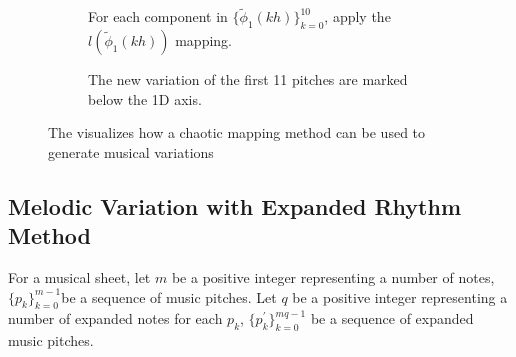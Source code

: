 \documentclass[11pt]{article}
\theoremstyle{definition}
\begin{document}
\begin{figure}
\begin{subfigure}{\textwidth}
  \caption{For each component in $\{\tilde{\phi}_1(kh)\}_{k=0}^{10}$, apply the $l(\tilde{\phi}_1(kh))$ mapping.}
  \label{subfig:traj2nmp}

\end{subfigure}

\vspace{5pt}

\begin{subfigure}{\textwidth}
  \centering
  \caption{The new variation of the first 11 pitches are marked below the 1D axis.}
  \label{subfig:nmp}

\end{subfigure}

\caption{The visualizes how a chaotic mapping method can be used to generate musical variations}
\label{fig:dabby method}
\end{figure}

\subsection{Melodic Variation with Expanded Rhythm Method} 
\label{subsec: melodicvariationwithexpandedrhythm}
For a musical sheet, let $m$ be a positive integer representing a number of notes, $\{p_k\}_{k=0}^{m-1}$be a sequence of music pitches. 
Let $q$ be a positive integer representing a number of expanded notes for each $p_k$, $\{p^\prime_k\}_{k=0}^{mq-1}$ be a sequence of expanded music pitches.

\end{document}
